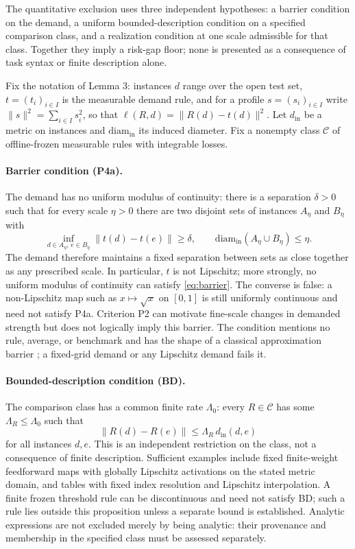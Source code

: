 \documentclass[twoside,11pt]{article}
\begin{document}
The quantitative exclusion uses three independent hypotheses: a barrier condition on the demand, a uniform bounded-description condition on a specified comparison class, and a realization condition at one scale admissible for that class. Together they imply a risk-gap floor; none is presented as a consequence of task syntax or finite description alone.

Fix the notation of Lemma 3: instances $d$ range over the open test set, $t=(t_i)_{i\in I}$ is the measurable demand rule, and for a profile $s=(s_i)_{i\in I}$ write $\|s\|^2=\sum_{i\in I}s_i^2$, so that $\ell(R,d)=\|R(d)-t(d)\|^2$. Let $d_{\mathrm{in}}$ be a metric on instances and $\mathrm{diam}_{\mathrm{in}}$ its induced diameter. Fix a nonempty class $\mathcal{C}$ of offline-frozen measurable rules with integrable losses.

\paragraph{Barrier condition (P4a).} The demand has no uniform modulus of continuity: there is a separation $\delta>0$ such that for every scale $\eta>0$ there are two disjoint sets of instances $A_\eta$ and $B_\eta$ with
\begin{equation}
\inf_{d\in A_\eta,\,e\in B_\eta}\|t(d)-t(e)\|\geq\delta, \qquad \mathrm{diam}_{\mathrm{in}}(A_\eta\cup B_\eta)\leq\eta .
\label{eq:barrier}
\end{equation}
The demand therefore maintains a fixed separation between sets as close together as any prescribed scale. In particular, $t$ is not Lipschitz; more strongly, no uniform modulus of continuity can satisfy \eqref{eq:barrier}. The converse is false: a non-Lipschitz map such as $x\mapsto\sqrt{x}$ on $[0,1]$ is still uniformly continuous and need not satisfy P4a. Criterion P2 can motivate fine-scale changes in demanded strength but does not logically imply this barrier. The condition mentions no rule, average, or benchmark and has the shape of a classical approximation barrier \citep{kolmogorov1936,pinkus1985}; a fixed-grid demand or any Lipschitz demand fails it.

\paragraph{Bounded-description condition (BD).} The comparison class has a common finite rate $\Lambda_0$: every $R\in\mathcal{C}$ has some $\Lambda_R\leq\Lambda_0$ such that
\begin{equation}
\|R(d)-R(e)\|\leq\Lambda_R\,d_{\mathrm{in}}(d,e)
\label{eq:rate}
\end{equation}
for all instances $d,e$. This is an independent restriction on the class, not a consequence of finite description. Sufficient examples include fixed finite-weight feedforward maps with globally Lipschitz activations on the stated metric domain, and tables with fixed index resolution and Lipschitz interpolation. A finite frozen threshold rule can be discontinuous and need not satisfy BD; such a rule lies outside this proposition unless a separate bound is established. Analytic expressions are not excluded merely by being analytic: their provenance and membership in the specified class must be assessed separately.
\end{document}
